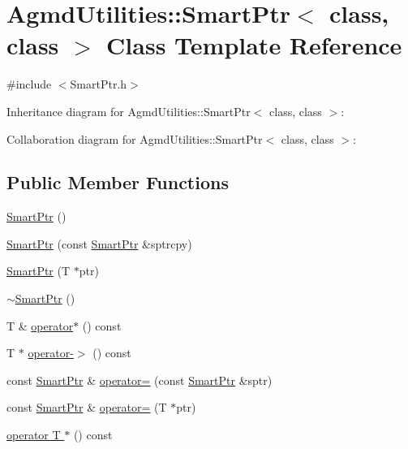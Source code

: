\hypertarget{class_agmd_utilities_1_1_smart_ptr}{\section{Agmd\+Utilities\+:\+:Smart\+Ptr$<$ class, class $>$ Class Template Reference}
\label{class_agmd_utilities_1_1_smart_ptr}
}


{\ttfamily \#include $<$Smart\+Ptr.\+h$>$}



Inheritance diagram for Agmd\+Utilities\+:\+:Smart\+Ptr$<$ class, class $>$\+:


Collaboration diagram for Agmd\+Utilities\+:\+:Smart\+Ptr$<$ class, class $>$\+:
\subsection*{Public Member Functions}
\begin{DoxyCompactItemize}
\item 
\hyperlink{class_agmd_utilities_1_1_smart_ptr_af535219cccfc3bd49ee5477967e6b8be}{Smart\+Ptr} ()
\item 
\hyperlink{class_agmd_utilities_1_1_smart_ptr_a3f4c4c89bedc5ce45f4cc8e99365934b}{Smart\+Ptr} (const \hyperlink{class_agmd_utilities_1_1_smart_ptr}{Smart\+Ptr} \&sptrcpy)
\item 
\hyperlink{class_agmd_utilities_1_1_smart_ptr_a4d6c8a5d2e738149c0b8c1fe3b725d0a}{Smart\+Ptr} (T $\ast$ptr)
\item 
\hyperlink{class_agmd_utilities_1_1_smart_ptr_a150140235baae6f831073ab0bb0901bd}{$\sim$\+Smart\+Ptr} ()
\item 
T \& \hyperlink{class_agmd_utilities_1_1_smart_ptr_a7a06109fb7026a86e0ab39f6214d366f}{operator$\ast$} () const 
\item 
T $\ast$ \hyperlink{class_agmd_utilities_1_1_smart_ptr_a020a87f636656edc1c3f698cea757e91}{operator-\/$>$} () const 
\item 
const \hyperlink{class_agmd_utilities_1_1_smart_ptr}{Smart\+Ptr} \& \hyperlink{class_agmd_utilities_1_1_smart_ptr_a30daa1711cf3c6d940453a7ee295f7d4}{operator=} (const \hyperlink{class_agmd_utilities_1_1_smart_ptr}{Smart\+Ptr} \&sptr)
\item 
const \hyperlink{class_agmd_utilities_1_1_smart_ptr}{Smart\+Ptr} \& \hyperlink{class_agmd_utilities_1_1_smart_ptr_af4727c0422c5e578364564377a673927}{operator=} (T $\ast$ptr)
\item 
\hyperlink{class_agmd_utilities_1_1_smart_ptr_a5f52741a61993d7ecb4c6e8dcbbca6fc}{operator T $\ast$} () const 
\end{DoxyCompactItemize}
